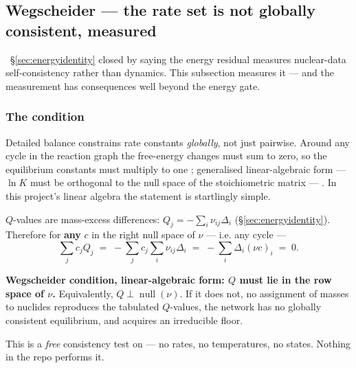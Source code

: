 \subsection{Wegscheider --- the rate set is not globally consistent, measured}
\label{sec:wegscheider}

\begin{warn}
\warnglyph{}~\S\ref{sec:energyidentity} closed by saying the energy residual
measures nuclear-data self-consistency rather than dynamics. This subsection
measures it --- and the measurement has consequences well beyond the energy
gate.
\end{warn}

\subsubsection{The condition}
\label{sec:wegscheider-condition}

Detailed balance constrains rate constants \emph{globally}, not just pairwise.
Around any cycle in the reaction graph the free-energy changes must sum to zero,
so the equilibrium constants must multiply to one \citep{wegscheider1901};
generalised linear-algebraic form --- $\ln K$ must be orthogonal to the null
space of the stoichiometric matrix --- \citep{schuster1989}. In this project's
linear algebra the statement is startlingly simple.

$Q$-values are mass-excess differences: $Q_j = -\sum_i \nu_{ij}\Delta_i$
(\S\ref{sec:energyidentity}). Therefore for \textbf{any} $c$ in the right null
space of $\nu$ --- i.e. any cycle ---
%
\begin{equation}
\sum_j c_j Q_j \;=\; -\sum_j c_j\sum_i \nu_{ij}\Delta_i
\;=\; -\sum_i \Delta_i(\nu c)_i \;=\; 0 .
\label{eq:wegscheider}
\end{equation}

\begin{invariant}
\textbf{Wegscheider condition, linear-algebraic form: $Q$ must lie in the row
space of $\nu$.} Equivalently, $Q \perp \operatorname{null}(\nu)$. If it does
not, no assignment of masses to nuclides reproduces the tabulated $Q$-values,
the network has no globally consistent equilibrium, and \kap{} acquires an
irreducible floor.
\end{invariant}

This is a \emph{free} consistency test on  --- no rates, no
temperatures, no states. Nothing in the repo performs it.


